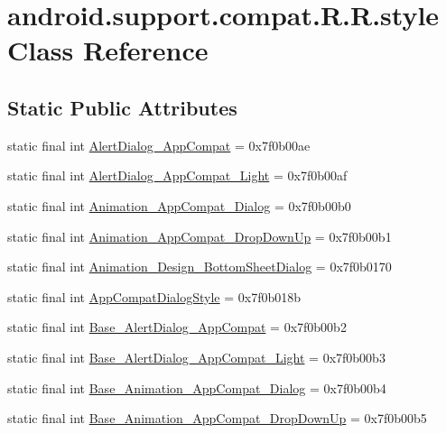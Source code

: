 \hypertarget{classandroid_1_1support_1_1compat_1_1_r_1_1style}{
\section{android.support.compat.R.R.style Class Reference}
\label{classandroid_1_1support_1_1compat_1_1_r_1_1style}
}
\subsection*{Static Public Attributes}
\begin{CompactItemize}
\item 
static final int \hyperlink{classandroid_1_1support_1_1compat_1_1_r_1_1style_bc943a5d06fb6e925b99aef327ef5a25}{AlertDialog\_\-AppCompat} = 0x7f0b00ae
\item 
static final int \hyperlink{classandroid_1_1support_1_1compat_1_1_r_1_1style_b31ec47ff09b1a0b0a17b23fd748bcf8}{AlertDialog\_\-AppCompat\_\-Light} = 0x7f0b00af
\item 
static final int \hyperlink{classandroid_1_1support_1_1compat_1_1_r_1_1style_2f559858eea7b0d9edfbd61f3be2afac}{Animation\_\-AppCompat\_\-Dialog} = 0x7f0b00b0
\item 
static final int \hyperlink{classandroid_1_1support_1_1compat_1_1_r_1_1style_cae4b7f80d1c82260ab8adbf469d9394}{Animation\_\-AppCompat\_\-DropDownUp} = 0x7f0b00b1
\item 
static final int \hyperlink{classandroid_1_1support_1_1compat_1_1_r_1_1style_e796350b5880730e475ae81b545423a5}{Animation\_\-Design\_\-BottomSheetDialog} = 0x7f0b0170
\item 
static final int \hyperlink{classandroid_1_1support_1_1compat_1_1_r_1_1style_b25461fa5475ff2f2dbeb554b1e34165}{AppCompatDialogStyle} = 0x7f0b018b
\item 
static final int \hyperlink{classandroid_1_1support_1_1compat_1_1_r_1_1style_833083d51d447d316973a359e843dde2}{Base\_\-AlertDialog\_\-AppCompat} = 0x7f0b00b2
\item 
static final int \hyperlink{classandroid_1_1support_1_1compat_1_1_r_1_1style_0ce291a3ea4e897161fea55d27d7f4e1}{Base\_\-AlertDialog\_\-AppCompat\_\-Light} = 0x7f0b00b3
\item 
static final int \hyperlink{classandroid_1_1support_1_1compat_1_1_r_1_1style_26deb833ad68f3ed5fde514ef92b3fa9}{Base\_\-Animation\_\-AppCompat\_\-Dialog} = 0x7f0b00b4
\item 
static final int \hyperlink{classandroid_1_1support_1_1compat_1_1_r_1_1style_5f201fed46be035c1b5c2f0a407b4b7b}{Base\_\-Animation\_\-AppCompat\_\-DropDownUp} = 0x7f0b00b5

\end{CompactItemize}
